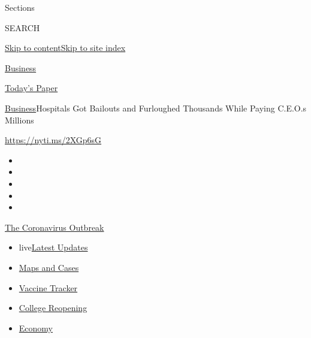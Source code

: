 Sections

SEARCH

\protect\hyperlink{site-content}{Skip to
content}\protect\hyperlink{site-index}{Skip to site index}

\href{https://www.nytimes3xbfgragh.onion/section/business}{Business}

\href{https://myaccount.nytimes3xbfgragh.onion/auth/login?response_type=cookie\&client_id=vi}{}

\href{https://www.nytimes3xbfgragh.onion/section/todayspaper}{Today's
Paper}

\href{/section/business}{Business}\textbar{}Hospitals Got Bailouts and
Furloughed Thousands While Paying C.E.O.s Millions

\url{https://nyti.ms/2XGp6sG}

\begin{itemize}
\item
\item
\item
\item
\item
\end{itemize}

\href{https://www.nytimes3xbfgragh.onion/news-event/coronavirus?action=click\&pgtype=Article\&state=default\&region=TOP_BANNER\&context=storylines_menu}{The
Coronavirus Outbreak}

\begin{itemize}
\tightlist
\item
  live\href{https://www.nytimes3xbfgragh.onion/2020/08/03/world/coronavirus-covid-19.html?action=click\&pgtype=Article\&state=default\&region=TOP_BANNER\&context=storylines_menu}{Latest
  Updates}
\item
  \href{https://www.nytimes3xbfgragh.onion/interactive/2020/us/coronavirus-us-cases.html?action=click\&pgtype=Article\&state=default\&region=TOP_BANNER\&context=storylines_menu}{Maps
  and Cases}
\item
  \href{https://www.nytimes3xbfgragh.onion/interactive/2020/science/coronavirus-vaccine-tracker.html?action=click\&pgtype=Article\&state=default\&region=TOP_BANNER\&context=storylines_menu}{Vaccine
  Tracker}
\item
  \href{https://www.nytimes3xbfgragh.onion/2020/08/02/us/covid-college-reopening.html?action=click\&pgtype=Article\&state=default\&region=TOP_BANNER\&context=storylines_menu}{College
  Reopening}
\item
  \href{https://www.nytimes3xbfgragh.onion/live/2020/08/03/business/stock-market-today-coronavirus?action=click\&pgtype=Article\&state=default\&region=TOP_BANNER\&context=storylines_menu}{Economy}
\end{itemize}

